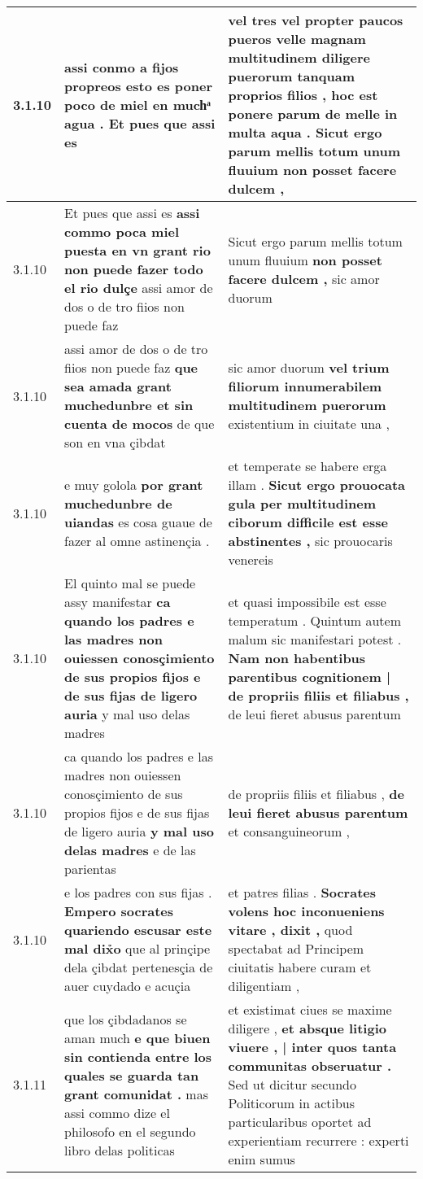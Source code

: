\begin{tabular}{|p{1cm}|p{6.5cm}|p{6.5cm}|}
3.1.10 & assi conmo a fijos propreos \textbf{ esto es poner poco de miel en muchͣ agua . } Et pues que assi es & vel tres vel propter paucos pueros velle magnam multitudinem diligere puerorum tanquam proprios filios , hoc est ponere parum de melle in multa aqua . \textbf{ Sicut ergo parum mellis totum unum fluuium } non posset facere dulcem , \\\hline
3.1.10 & Et pues que assi es \textbf{ assi commo poca miel puesta en vn grant rio non puede fazer todo el rio dulçe } assi amor de dos o de tro fiios non puede faz & Sicut ergo parum mellis totum unum fluuium \textbf{ non posset facere dulcem , } sic amor duorum \\\hline
3.1.10 & assi amor de dos o de tro fiios non puede faz \textbf{ que sea amada grant muchedunbre et sin cuenta de mocos } de que son en vna çibdat & sic amor duorum \textbf{ vel trium filiorum innumerabilem multitudinem puerorum } existentium in ciuitate una , \\\hline
3.1.10 & e muy golola \textbf{ por grant muchedunbre de uiandas } es cosa guaue de fazer al omne astinençia . & et temperate se habere erga illam . \textbf{ Sicut ergo prouocata gula per multitudinem ciborum difficile est esse abstinentes , } sic prouocaris venereis \\\hline
3.1.10 & El quinto mal se puede assy manifestar \textbf{ ca quando los padres e las madres non ouiessen conosçimiento de sus propios fijos e de sus fijas de ligero auria } y mal uso delas madres & et quasi impossibile est esse temperatum . Quintum autem malum sic manifestari potest . \textbf{ Nam non habentibus parentibus cognitionem | de propriis filiis et filiabus , } de leui fieret abusus parentum \\\hline
3.1.10 & ca quando los padres e las madres non ouiessen conosçimiento de sus propios fijos e de sus fijas de ligero auria \textbf{ y mal uso delas madres } e de las parientas & de propriis filiis et filiabus , \textbf{ de leui fieret abusus parentum } et consanguineorum , \\\hline
3.1.10 & e los padres con sus fijas . \textbf{ Empero socrates quariendo escusar este mal dix̉o } que al prinçipe dela çibdat pertenesçia de auer cuydado e acuçia & et patres filias . \textbf{ Socrates volens hoc inconueniens vitare , dixit , } quod spectabat ad Principem ciuitatis habere curam et diligentiam , \\\hline
3.1.11 & que los çibdadanos se aman much \textbf{ e que biuen sin contienda entre los quales se guarda tan grant comunidat . } mas assi commo dize el philosofo en el segundo libro delas politicas & et existimat ciues se maxime diligere , \textbf{ et absque litigio viuere , | inter quos tanta communitas obseruatur . } Sed ut dicitur secundo Politicorum in actibus particularibus oportet ad experientiam recurrere : experti enim sumus \\\hline

\end{tabular}
